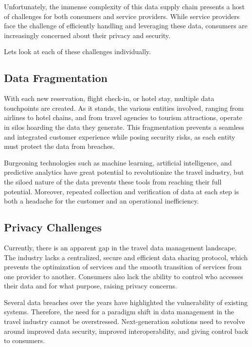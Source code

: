 \documentclass{article}
\begin{document}
Unfortunately, the immense complexity of this data supply chain presents a host of challenges for both consumers and service providers. While service providers face the challenge of efficiently handling and leveraging these data, consumers are increasingly concerned about their privacy and security.

Lets look at each of these challenges individually. 

\subsection{Data Fragmentation}

With each new reservation, flight check-in, or hotel stay, multiple data touchpoints are created. As it stands, the various entities involved, ranging from airlines to hotel chains, and from travel agencies to tourism attractions, operate in silos hoarding the data they generate. This fragmentation prevents a seamless and integrated customer experience while posing security risks, as each entity must protect the data from breaches.

Burgeoning technologies such as machine learning, artificial intelligence, and predictive analytics have great potential to revolutionize the travel industry, but the siloed nature of the data prevents these tools from reaching their full potential. Moreover, repeated collection and verification of data at each step is both a headache for the customer and an operational inefficiency.

\subsection{Privacy Challenges}

Currently, there is an apparent gap in the travel data management landscape. The industry lacks a centralized, secure and efficient data sharing protocol, which prevents the optimization of services and the smooth transition of services from one provider to another. Consumers also lack the ability to control who accesses their data and for what purpose, raising privacy concerns.

Several data breaches over the years have highlighted the vulnerability of existing systems. Therefore, the need for a paradigm shift in data management in the travel industry cannot be overstressed. Next-generation solutions need to revolve around improved data security, improved interoperability, and giving control back to consumers.
\end{document}
